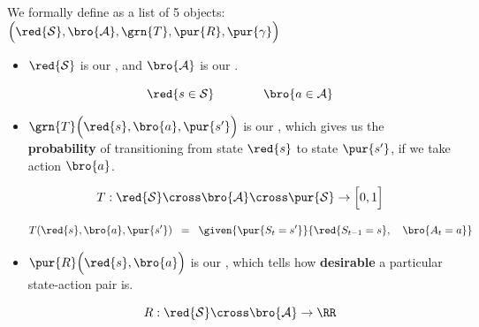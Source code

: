         \begin{definition}
            We formally define  as a list of 5 objects: $\Big( \red{\mathcal{S}}, \bro{\mathcal{A}}, \grn{T}, \pur{R}, \pur{\gamma} \Big)$

            \begin{itemize}
                \item $\red{\mathcal{S}}$ is our , and $\bro{\mathcal{A}}$ is our .

                \begin{equation*}
                    \red{s \in \mathcal{S}}  \qquad \qquad \bro{a \in \mathcal{A}}
                \end{equation*}

                \item $\grn{T} \Big( \red{s},\bro{a},\pur{s'} \Big)$ is our , which gives us the \textbf{probability} of transitioning from state $\red{s}$ to state $\pur{s'}$, if we take action $\bro{a}$.

                \begin{equation*}
                    \begin{gathered}
                        T: \red{\mathcal{S}} \cross \bro{\mathcal{A}} \cross \pur{\mathcal{S}}   \to \Big[0, 1 \Big]\\
                    \end{gathered}           
                \end{equation*}

                \begin{equation*}
                    T(\red{s},\bro{a},\pur{s'}) \;\;=\;\; 
                    \given{ \pur{S_t = s'}  }{\red{S_{t-1} = s},\quad \bro{A_t = a}}
                \end{equation*}

                \item $\pur{R} \Big( \red{s},\bro{a} \Big)$ is our , which tells how \textbf{desirable} a particular state-action pair is.

                \begin{equation*}
                    R: \red{\mathcal{S}} \cross \bro{\mathcal{A}} \to \RR
                \end{equation*}
    
            \end{itemize}
            
            

        \end{definition}

